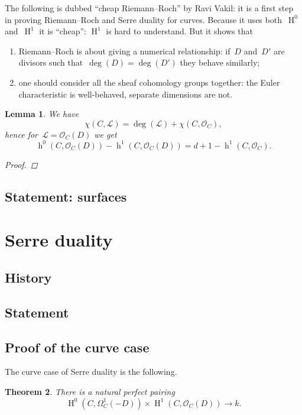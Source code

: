 \documentclass[10pt,a4paper]{article}
\theoremstyle{lecture}
\newtheorem{theorem}{Theorem}
\newtheorem{lemma}[theorem]{Lemma}
\DeclareMathOperator\hh{h}
\DeclareMathOperator\HH{H}
\begin{document}
The following is dubbed ``cheap Riemann--Roch'' by Ravi Vakil: it is a first step in proving Riemann--Roch and Serre duality for curves. Because it uses both~$\HH^0$ and~$\HH^1$ it is ``cheap'': $\HH^1$ is hard to understand. But it shows that
\begin{enumerate}
  \item Riemann--Roch is about giving a numerical relationship: if~$D$ and~$D'$ are divisors such that~$\deg(D)=\deg(D')$ they behave similarly;
  \item one should consider all the sheaf cohomology groups together: the Euler characteristic is well-behaved, separate dimensions are not.
\end{enumerate}
\begin{lemma}
  \label{lemma:cheap-riemann-roch}
  We have
  \begin{equation}
    \chi(C,\mathcal{L})=\deg(\mathcal{L})+\chi(C,\mathcal{O}_C),
  \end{equation}
  hence for~$\mathcal{L}=\mathcal{O}_C(D)$ we get
  \begin{equation}
    \hh^0(C,\mathcal{O}_C(D))-\hh^1(C,\mathcal{O}_C(D))=d+1-\hh^1(C,\mathcal{O}_C).
  \end{equation}
  \begin{proof}
    \expand
  \end{proof}
\end{lemma}

\subsection{Statement: surfaces}
\label{subsection:statement-surfaces}


\section{Serre duality}
\label{section:serre-duality}
\subsection{History}
\label{subsection-serre-duality-history}

\subsection{Statement}
\label{subsection:serre-duality-statement}

\subsection{Proof of the curve case}
\label{subsection:serre-duality-curves}
The curve case of Serre duality is the following.
\begin{theorem}
  \label{theorem:serre-duality-curves}
  There is a natural perfect pairing
  \begin{equation}
    \HH^0(C,\Omega_C^1(-D))\times\HH^1(C,\mathcal{O}_C(D))\to k.
  \end{equation}
\end{theorem}
\end{document}

